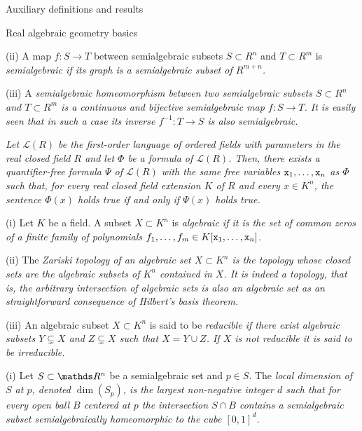 \documentclass[11pt, a4paper, english, twoside, notitlepage, openright]{report}
\begin{document}
\begin{chapter}{Auxiliary definitions and results}
\begin{section}{Real algebraic geometry basics}
\begin{definitions}
	
(ii) A map $f:S\to T$ between semialgebraic subsets $S\subset R^n$ and $T\subset R^m$ is \em semialgebraic \em if its graph is a semialgebraic subset of $R^{m+n}$.  \end{definitions}


(iii) A \em semialgebraic homeomorphism \em between two semialgebraic subsets $S\subset R^n$ and $T\subset R^m$ is a continuous and bijective semialgebraic map $f:S\to T$. It is easily seen that in such a case its inverse $f^{-1}:T\to S$ is also semialgebraic.

\begin{theorem}\label{TP} \em Let ${\mathcal L}(R)$ be the first-order language of ordered fields with parameters in the real closed field $R$ and let $\Phi$ be a formula of ${\mathcal L}(R)$. Then, there exists a quantifier-free formula $\Psi$ of ${\mathcal L}(R)$ with the same free variables ${\tt x}_1,\dots,{\tt x}_n$ as $\Phi$ such that, for every real closed field extension $K$ of $R$ and every $x\in K^n$, the sentence $\Phi(x)$ holds true if and only if $\Psi(x)$ holds true.\em

\end{theorem}

\begin{definition}\label{zariski} (i) Let $K$ be a field. A subset $X\subset K^n$ is \em algebraic \em if it is the set of common zeros of a finite family of polynomials $f_1,\dots,f_m\in K[{\tt x}_1,\dots,{\tt x}_n]$. 

(ii) The \em Zariski topology \em of an algebraic set $X\subset K^n$ is the topology whose closed sets are the algebraic subsets of $K^n$ contained in $X$. It is indeed a topology, that is, the arbitrary intersection of algebraic sets is also an algebraic set as an straightforward consequence of Hilbert's basis theorem.

(iii) An algebraic subset $X\subset K^n$ is said to be \em reducible \em if there exist algebraic subsets $Y\subsetneq X$ and  $Z\subsetneq X$ such that $X=Y\cup Z$. If $X$ is not reducible it is said to be  \em irreducible. \em 
\end{definition}

\begin{definition}\label{pureDim} (i) Let $S\subset\R^n$ be a semialgebraic set and $p\in S$. The \em local dimension of $S$ at $p$, \em denoted $\dim(S_p)$, is the largest non-negative integer $d$ such that for every open ball $B$ centered at $p$ the intersection $S\cap B$ contains a semialgebraic subset semialgebraically homeomorphic to the cube $[0,1]^d$.


\end{definition}
\end{section}
\end{chapter}
\end{document}
